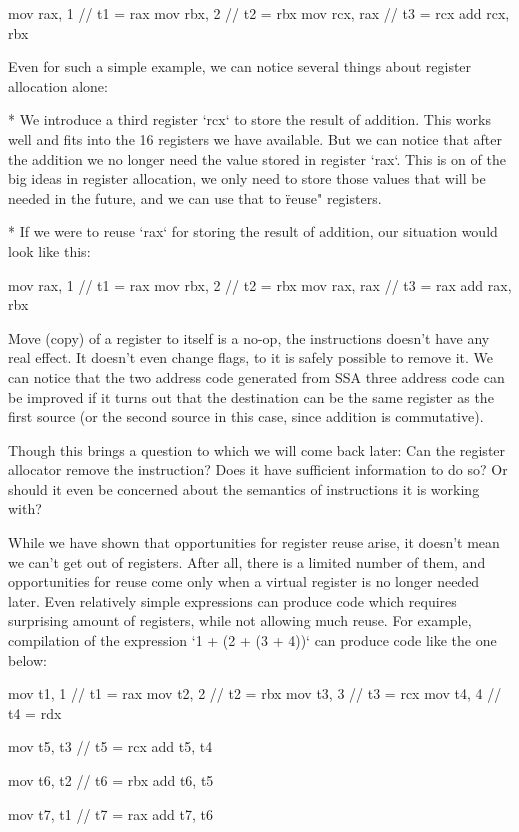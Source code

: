 \begtt
mov rax, 1   // t1 = rax
mov rbx, 2   // t2 = rbx
mov rcx, rax // t3 = rcx
add rcx, rbx
\endtt

Even for such a simple example, we can notice several things about register
allocation alone:

\begitems
 * We introduce a third register `rcx` to store the result of addition. This
works well and fits into the 16 registers we have available. But we can notice
that after the addition we no longer need the value stored in register `rax`.
This is on of the big ideas in register allocation, we only need to store those
values that will be needed in the future, and we can use that to \"reuse"
registers.

* If we were to reuse `rax` for storing the result of addition, our situation
would look like this:

\begtt
mov rax, 1   // t1 = rax
mov rbx, 2   // t2 = rbx
mov rax, rax // t3 = rax
add rax, rbx
\endtt

Move (copy) of a register to itself is a no-op, the instructions doesn't have
any real effect. It doesn't even change flags, to it is safely possible to
remove it. We can notice that the two address code generated
from SSA three address code can be improved if it turns out that the
destination can be the same register as the first source (or the second source
in this case, since addition is commutative).

Though this brings a question to which we will come back later: Can the register
allocator remove the instruction? Does it have sufficient information to do so?
Or should it even be concerned about the semantics of instructions it is working
with?
\enditems

While we have shown that opportunities for register reuse arise, it doesn't mean
we can't get out of registers. After all, there is a limited number of them, and
opportunities for reuse come only when a virtual register is no longer needed
later. Even relatively simple expressions can produce code which requires
surprising amount of registers, while not allowing much reuse. For example,
compilation of the expression `1 + (2 + (3 + 4))` can produce code like the one
below:

\begtt
mov t1, 1  // t1 = rax
mov t2, 2  // t2 = rbx
mov t3, 3  // t3 = rcx
mov t4, 4  // t4 = rdx

mov t5, t3 // t5 = rcx
add t5, t4

mov t6, t2 // t6 = rbx
add t6, t5

mov t7, t1 // t7 = rax
add t7, t6
\endtt


